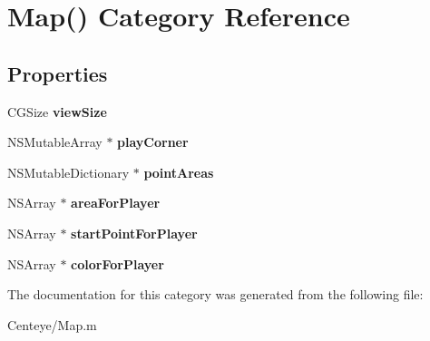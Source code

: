 \hypertarget{category_map_07_08}{\section{Map() Category Reference}
\label{category_map_07_08}
}
\subsection*{Properties}
\begin{DoxyCompactItemize}
\item 
\hypertarget{category_map_07_08_a4c47b3798f946da043b58aae7438364a}{C\+G\+Size {\bfseries view\+Size}}\label{category_map_07_08_a4c47b3798f946da043b58aae7438364a}

\item 
\hypertarget{category_map_07_08_a05558c552bf40d6b508b8e6d5af59651}{N\+S\+Mutable\+Array $\ast$ {\bfseries play\+Corner}}\label{category_map_07_08_a05558c552bf40d6b508b8e6d5af59651}

\item 
\hypertarget{category_map_07_08_aae0c38f9dc944d5f71d157316734e893}{N\+S\+Mutable\+Dictionary $\ast$ {\bfseries point\+Areas}}\label{category_map_07_08_aae0c38f9dc944d5f71d157316734e893}

\item 
\hypertarget{category_map_07_08_a7c35b54fd861225f38f607d0e2122622}{N\+S\+Array $\ast$ {\bfseries area\+For\+Player}}\label{category_map_07_08_a7c35b54fd861225f38f607d0e2122622}

\item 
\hypertarget{category_map_07_08_a1414f22a6bebb1662a2223cce2fb23b2}{N\+S\+Array $\ast$ {\bfseries start\+Point\+For\+Player}}\label{category_map_07_08_a1414f22a6bebb1662a2223cce2fb23b2}

\item 
\hypertarget{category_map_07_08_a0da0b33712125f1ecfc566918ae56a1c}{N\+S\+Array $\ast$ {\bfseries color\+For\+Player}}\label{category_map_07_08_a0da0b33712125f1ecfc566918ae56a1c}

\end{DoxyCompactItemize}


The documentation for this category was generated from the following file\+:\begin{DoxyCompactItemize}
\item 
Centeye/Map.\+m\end{DoxyCompactItemize}
